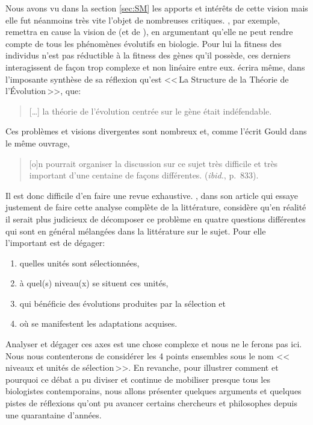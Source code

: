 Nous avons vu dans la section \ref{sec:SM} les apports et intérêts de cette vision mais elle fut néanmoins très vite l'objet de nombreuses critiques. \cite{wimsatt1980theunitsofselectionandthestructureofthemultilevelgenome}, par exemple, remettra en cause la vision de \cite{williams1966adaptationandnaturalselection} (et de \cite{dawkins76selfishgene}), en argumentant qu'elle ne peut rendre compte de tous les phénomènes évolutifs en biologie. Pour lui la fitness des individus n'est pas réductible à la fitness des gènes qu'il possède, ces derniers interagissent de façon trop complexe et non linéaire entre eux. \cite{gould2002thestructureofevolutionarytheory} écrira même, dans l'imposante synthèse de sa réflexion qu'est <<\,La Structure de la Théorie de l'\'Evolution\,>>, que:
\begin{quote}
	[\ldots] la théorie de l'évolution centrée sur le gène était indéfendable.\\ \citep[p.~855]{gould2002thestructureofevolutionarytheory}
\end{quote}
Ces problèmes et visions divergentes sont nombreux et, comme l'écrit Gould dans le même ouvrage,
\begin{quote}
	[o]n pourrait organiser la discussion sur ce sujet très difficile et très important d'une centaine de façons différentes. (\emph{ibid.}, p.~833).
\end{quote}
Il est donc difficile d'en faire une revue exhaustive. \cite{lloyd12unitsandlevelsofselection}, dans son article qui essaye justement de faire cette analyse complète de la littérature, considère qu'en réalité il serait plus judicieux de décomposer ce problème en quatre questions différentes qui sont en général mélangées dans la littérature sur le sujet. Pour elle l'important est de dégager: 
\begin{enumerate}
	\item quelles unités sont sélectionnées,
	\item à quel(s) niveau(x) se situent ces unités,
	\item qui bénéficie des évolutions produites par la sélection et
	\item où se manifestent les adaptations acquises.
\end{enumerate}

Analyser et dégager ces axes est une chose complexe  et nous ne le ferons pas ici.  Nous nous contenterons de considérer les 4 points ensembles sous le nom <<\,niveaux et unités de sélection\,>>. En revanche, pour illustrer comment et pourquoi ce débat a pu diviser et continue de mobiliser presque tous les biologistes contemporains, nous allons présenter quelques arguments et quelques pistes de réflexions qu'ont pu avancer certains chercheurs et philosophes depuis une quarantaine d'années.

